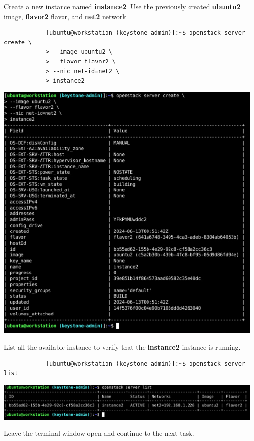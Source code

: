 \documentclass[letterpaper, 12pt]{article}
\begin{document}
\begin{enumerate}
    \begin{labstep}
        Create a new instance named \textbf{instance2}.
        Use the previously created \textbf{ubuntu2} image, \textbf{flavor2} flavor, and \textbf{net2} network.
        \begin{lstlisting}
            [ubuntu@workstation (keystone-admin)]:~$ openstack server create \
            > --image ubuntu2 \
            > --flavor flavor2 \
            > --nic net-id=net2 \
            > instance2
        \end{lstlisting}

        \begin{center}
            \includegraphics[width=\linewidth]{images/part4/step12.png}
        \end{center}
    \end{labstep}

    \begin{labstep}
        List all the available instance to verify that the \textbf{instance2} instance is running.
        \begin{lstlisting}
            [ubuntu@workstation (keystone-admin)]:~$ openstack server list
        \end{lstlisting}

        \begin{center}
            \includegraphics[width=\linewidth]{images/part4/step13.png}
        \end{center}
    \end{labstep}

    \begin{labstep}
        Leave the terminal window open and continue to the next task.
    \end{labstep}

\end{enumerate}
\end{document}
